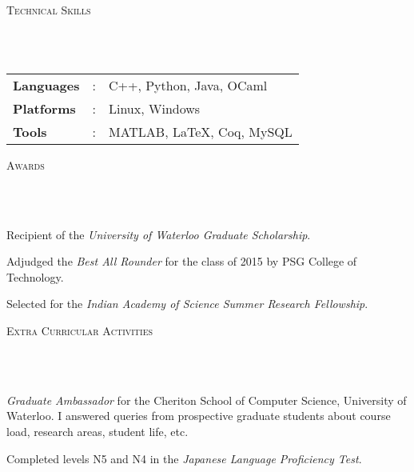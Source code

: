 \documentclass{article}
\newcommand{\header}[1]{{
\hspace*{-15pt}\vspace*{6pt} \textsc{#1}} \vspace*{-6pt} 
\lineunder
}
\newcommand{\lineunder}{
\vspace*{-8pt} \\ \hspace*{-18pt} 
\hrulefill \\
}
\renewcommand{\labelitemii}{
$\vcenter{\hbox{\tiny$\bullet$}}$\hspace*{-3pt}
}
\newenvironment{bullet-list-major}{
\begin{list}{\labelitemii}{\setlength\leftmargin{3pt} 
\topsep 0pt \itemsep -2pt}}{\vspace*{4pt}\end{list}
}
\begin{document}
\vspace*{4pt}%
\header{Technical Skills}
\begin{tabular}{l l l}

\textbf{Languages}&: & C++, Python, Java, OCaml\\
\textbf{Platforms}&:  & Linux, Windows\\
\textbf{Tools}&:     &MATLAB, \LaTeX, Coq, MySQL
\end{tabular}


\vspace*{4pt}%
\header{Awards}
    \begin{bullet-list-major}
    \item Recipient of the \textit{University of Waterloo Graduate Scholarship}.
    \item Adjudged the \textit{Best All Rounder} for the class of 2015 by PSG College of
        Technology. 
    \item Selected for the \textit{Indian Academy of Science Summer Research
            Fellowship}.
    \end{bullet-list-major}

\vspace*{4pt}%
\header{Extra Curricular Activities}
    \begin{bullet-list-major}
    \item \textit{Graduate Ambassador} for the Cheriton School of Computer Science,
        University of Waterloo. I answered queries from prospective graduate
        students about course load, research areas, student life, etc.
    \item Completed levels N5 and N4 in the \textit{Japanese Language
            Proficiency Test}.
    \end{bullet-list-major}
\end{document}
